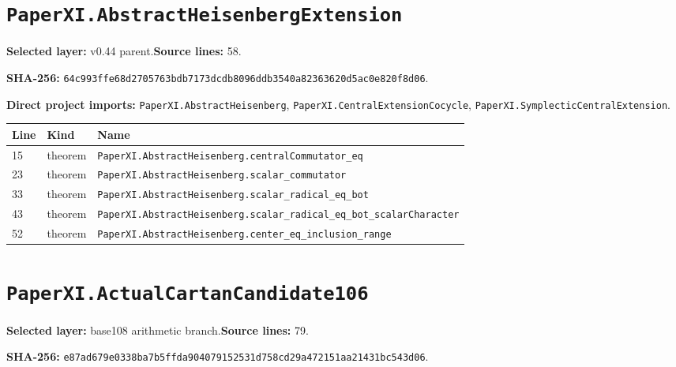 \documentclass[10pt,oneside]{book}
\begin{document}
\section{\texorpdfstring{\nolinkurl{PaperXI.AbstractHeisenbergExtension}}{PaperXI.AbstractHeisenbergExtension}}\label{module:PaperXI.AbstractHeisenbergExtension}

\textbf{Selected layer:} v0.44 parent.\quad\textbf{Source lines:} 58.\par\textbf{SHA-256:} {\scriptsize\nolinkurl{64c993ffe68d2705763bdb7173dcdb8096ddb3540a82363620d5ac0e820f8d06}}.


\textbf{Direct project imports:} \nolinkurl{PaperXI.AbstractHeisenberg}, \nolinkurl{PaperXI.CentralExtensionCocycle}, \nolinkurl{PaperXI.SymplecticCentralExtension}.

\begin{longtable}{@{}p{}p{}p{}@{}}\toprule Line&Kind&Name\\\midrule\endhead

15&theorem&\nolinkurl{PaperXI.AbstractHeisenberg.centralCommutator_eq}\\

23&theorem&\nolinkurl{PaperXI.AbstractHeisenberg.scalar_commutator}\\

33&theorem&\nolinkurl{PaperXI.AbstractHeisenberg.scalar_radical_eq_bot}\\

43&theorem&\nolinkurl{PaperXI.AbstractHeisenberg.scalar_radical_eq_bot_scalarCharacter}\\

52&theorem&\nolinkurl{PaperXI.AbstractHeisenberg.center_eq_inclusion_range}\\

\bottomrule\end{longtable}

\section{\texorpdfstring{\nolinkurl{PaperXI.ActualCartanCandidate106}}{PaperXI.ActualCartanCandidate106}}\label{module:PaperXI.ActualCartanCandidate106}

\textbf{Selected layer:} base108 arithmetic branch.\quad\textbf{Source lines:} 79.\par\textbf{SHA-256:} {\scriptsize\nolinkurl{e87ad679e0338ba7b5ffda904079152531d758cd29a472151aa21431bc543d06}}.
\end{document}
